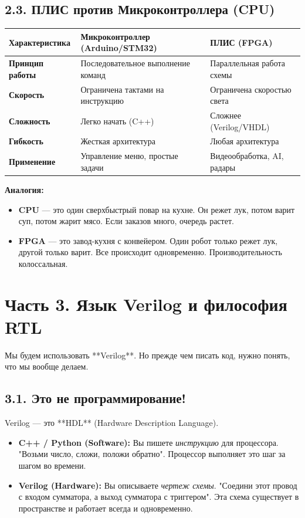 \documentclass[12pt, a4paper]{article}
\begin{document}
\subsection{2.3. ПЛИС против Микроконтроллера (CPU)}
\begin{table}[h]
\centering
\begin{tabular}{|l|l|l|}
\hline
\textbf{Характеристика} & \textbf{Микроконтроллер (Arduino/STM32)} & \textbf{ПЛИС (FPGA)} \\ \hline
\textbf{Принцип работы} & Последовательное выполнение команд & Параллельная работа схемы \\ \hline
\textbf{Скорость} & Ограничена тактами на инструкцию & Ограничена скоростью света \\ \hline
\textbf{Сложность} & Легко начать (C++) & Сложнее (Verilog/VHDL) \\ \hline
\textbf{Гибкость} & Жесткая архитектура & Любая архитектура \\ \hline
\textbf{Применение} & Управление меню, простые задачи & Видеообработка, AI, радары \\ \hline
\end{tabular}
\end{table}

\textbf{Аналогия:}
\begin{itemize}
    \item \textbf{CPU} — это один сверхбыстрый повар на кухне. Он режет лук, потом варит суп, потом жарит мясо. Если заказов много, очередь растет.
    \item \textbf{FPGA} — это завод-кухня с конвейером. Один робот только режет лук, другой только варит. Все происходит одновременно. Производительность колоссальная.
\end{itemize}

\newpage

\section{Часть 3. Язык Verilog и философия RTL}

Мы будем использовать **Verilog**. Но прежде чем писать код, нужно понять, что мы вообще делаем.

\subsection{3.1. Это не программирование!}
Verilog — это **HDL** (Hardware Description Language).
\begin{itemize}
    \item \textbf{C++ / Python (Software):} Вы пишете \textit{инструкцию} для процессора. "Возьми число, сложи, положи обратно". Процессор выполняет это шаг за шагом во времени.
    \item \textbf{Verilog (Hardware):} Вы описываете \textit{чертеж схемы}. "Соедини этот провод с входом сумматора, а выход сумматора с триггером". Эта схема существует в пространстве и работает всегда и одновременно.
\end{itemize}
\end{document}
